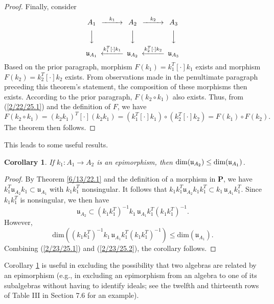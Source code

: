 \documentclass{amsart}
\newtheorem{corollary}[theorem]{Corollary}
\theoremstyle{definition}
\numberwithin{theorem}{section}
\numberwithin{equation}{section}
\begin{document}
\begin{proof}
Finally, consider
      \[  \begin{CD}  
A_1 @>k_1>> A_2 @>k_2>> A_3\\
 @VVV   @VVV  @VVV\\
\mathfrak{u}_{A_1}   @<k_1^T[\cdot]k_1<<  \mathfrak{u}_{A_2}  @<k_2^T[\cdot]k_2<<  \mathfrak{u}_{A_3} \\ 
 \end{CD} \]
Based on the prior paragraph, morphism $F(k_1) = k_1^T[\cdot]k_1$ exists and morphism $F(k_2) = k_2^T[\cdot]k_2$ exists.  From observations made in the penultimate paragraph preceding this theorem's statement, the composition of these morphisms then exists.  According to the prior paragraph, $F(k_2\circ k_1)$ also exists.   Thus, from (\ref{2/22/25.1}) and the definition of $F$, we have \[ F(k_2\circ k_1) = (k_2k_1)^T[\cdot](k_2k_1) = (k_1^T[\cdot] k_1)\circ (k_2^T[\cdot]k_2)  = F(k_1)\circ F(k_2).\]   The theorem then follows.
\end{proof}

This leads to some useful results.  



\begin{corollary} \label{8/17/22.5} If $k_1:A_1\rightarrow A_2$ is an epimorphism, then ${\rm dim}(\mathfrak{u}_{A_2}) \le {\rm dim}(\mathfrak{u}_{A_1})$. \end{corollary}  

\begin{proof} By Theorem \ref{6/13/22.1} and the definition of a morphism in $\mathbf{P}$, we have \mbox{$k_1^T \mathfrak{u}_{A_2} k_1 \subset \mathfrak{u}_{A_1}$} with $k_1k_1^T$ nonsingular.  It follows that  $k_1k_1^T \mathfrak{u}_{A_2} k_1k_1^T \subset k_1\,\mathfrak{u}_{A_1}k_1^T$.  Since $k_1k_1^T$ is nonsingular, we then have 
\begin{equation}\label{2/23/25.1} \mathfrak{u}_{A_2} \subset (k_1k_1^T)^{-1}k_1\, \mathfrak{u}_{A_1} k_1^T(k_1k_1^T)^{-1}.\end{equation}  However, \begin{equation}\label{2/23/25.2}  \text{dim}\left((k_1k_1^T)^{-1}k_1 \,\mathfrak{u}_{A_1} k_1^T(k_1k_1^T)^{-1}\right) \le \text{dim}(\mathfrak{u}_{A_1}).\end{equation} Combining (\ref{2/23/25.1}) and (\ref{2/23/25.2}), the corollary follows.
   \end{proof}
   
  Corollary \ref{8/17/22.5} is useful in excluding the possibility that two algebras are related by an epimorphism (e.g., in excluding an epimorphism from an algebra to one of its subalgebras without having to identify ideals; see the twelfth and thirteenth rows of Table III in Section 7.6 for an example).
\end{document}
